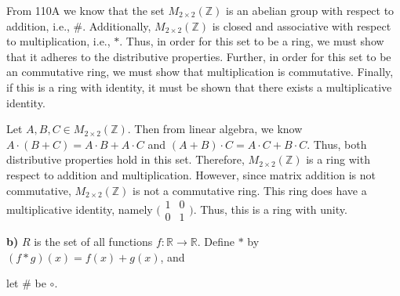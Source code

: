 \documentclass[12pt, a4paper]{article}
\begin{document}
\begin{addmargin}[2.8em]{2.8em}

    \noindent From 110A we know that the set $M_{2\times 2}(\mathbb{Z})$ is an abelian group with respect to addition, i.e., $\#$. Additionally, $M_{2\times 2}(\mathbb{Z})$ is closed and associative with respect to multiplication, i.e., $*$. Thus, in order for this set to be a ring, we must show that it adheres to the distributive properties. Further, in order for this set to be an commutative ring, we must show that multiplication is commutative. Finally, if this is a ring with identity, it must be shown that there exists a multiplicative identity.
    
    \vspace{4mm }
    
    \noindent Let $A,B,C\in M_{2\times 2}(\mathbb{Z})$. Then from linear algebra, we know $A\cdot(B+C)=A\cdot B+A\cdot C$ and $(A+B)\cdot C=A\cdot C+B\cdot C$. Thus, both distributive properties hold in this set. Therefore, $M_{2\times 2}(\mathbb{Z})$ is a ring with respect to addition and multiplication. However, since matrix addition is not commutative, $M_{2\times 2}(\mathbb{Z})$ is not a commutative ring. This ring does have a multiplicative identity, namely $\bigl( \begin{smallmatrix} 1&0\\ 0&1 \end{smallmatrix} \bigr)$. Thus, this is a ring with unity.

\end{addmargin}

\vspace{4mm}

\par\textbf{b)} $R$ is the set of all functions $f\colon\mathbb{R}\rightarrow\mathbb{R}$. Define $*$ by $(f*g)(x)=f(x)+g(x)$, and\par\hspace{4.3mm} let $\#$ be $\circ$. 

\vspace{4mm}
\end{document}
